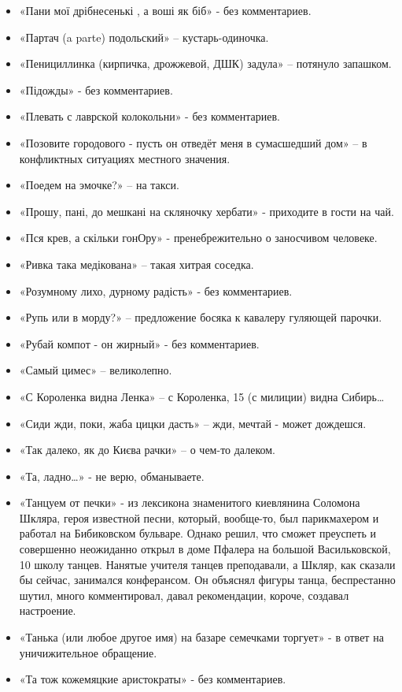 \begin{itemize}
\item  «Пани мої дрібнесенькі , а воші як біб» - без комментариев.
\item  «Партач (a parte) подольский» – кустарь-одиночка.  
\item  «Пенициллинка (кирпичка, дрожжевой, ДШК) задула» – потянуло запашком.
\item  «Підожды» - без комментариев.
\item  «Плевать с лаврской колокольни» - без комментариев.
\item  «Позовите городового - пусть он отведёт меня в сумасшедший дом» – в конфликтных ситуациях местного значения.
\item  «Поедем на эмочке?» – на такси.
\item  «Прошу, пані, до мешкані на скляночку хербати» - приходите в гости на чай.
\item  «Пся крев, а скільки гонОру» - пренебрежительно о заносчивом человеке.
\item  «Ривка така медікована» – такая хитрая соседка.
\item  «Розумному лихо, дурному радість» - без комментариев.
\item  «Рупь или в морду?» – предложение босяка к кавалеру гуляющей парочки.
\item  «Рубай компот - он жирный» - без комментариев.
\item  «Самый цимес» – великолепно.
\item  «С Короленка видна Ленка» – с Короленка, 15 (с милиции) видна Сибирь…
\item  «Сиди жди, поки, жаба цицки дасть» – жди, мечтай - может дождешся.
\item  «Так далеко, як до Києва рачки» – о чем-то далеком.
\item  «Та, ладно…» - не верю, обманываете.
\item  «Танцуем от печки» - из лексикона знаменитого киевлянина Соломона Шкляра, героя известной песни, который, вообще-то, был парикмахером и работал на Бибиковском бульваре. Однако решил, что сможет преуспеть и совершенно неожиданно открыл в доме Пфалера на большой Васильковской, 10 школу танцев. Нанятые учителя танцев преподавали, а Шкляр, как сказали бы сейчас, занимался конферансом. Он объяснял фигуры танца, беспрестанно шутил, много комментировал, давал рекомендации, короче, создавал настроение. 
\item  «Танька (или любое другое имя) на базаре семечками торгует» - в ответ на уничижительное обращение.
\item  «Та тож кожемяцкие аристократы» - без комментариев.

\end{itemize}
